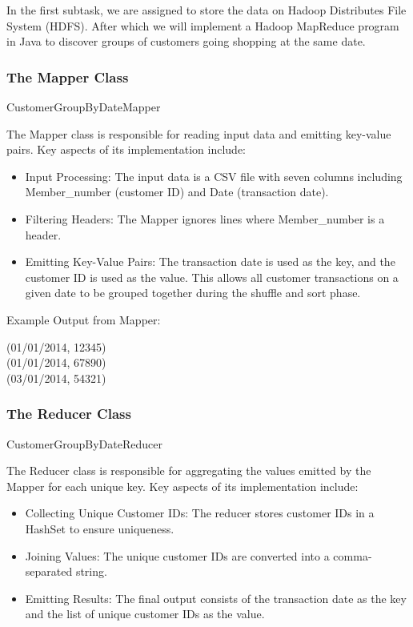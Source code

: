 In the first subtask, we are assigned to store the data on Hadoop Distributes File System (HDFS).
After which we will implement a Hadoop MapReduce program in Java to discover groups of customers going shopping at the same date.

\subsubsection{The Mapper Class} CustomerGroupByDateMapper

The Mapper class is responsible for reading input data and emitting key-value pairs.
Key aspects of its implementation include:

\begin{itemize}
    \item Input Processing: The input data is a CSV file with seven columns including Member\_number (customer ID) and Date (transaction date).
    \item Filtering Headers: The Mapper ignores lines where Member\_number is a header.
    \item Emitting Key-Value Pairs: The transaction date is used as the key, and the customer ID is used as the value.
    This allows all customer transactions on a given date to be grouped together during the shuffle and sort phase.
\end{itemize}

Example Output from Mapper:
\begin{center}
(01/01/2014, 12345)\\
(01/01/2014, 67890)\\
(03/01/2014, 54321)
\end{center}

\subsubsection{The Reducer Class} CustomerGroupByDateReducer

The Reducer class is responsible for aggregating the values emitted by the Mapper for each unique key.
Key aspects of its implementation include:

\begin{itemize}
    \item Collecting Unique Customer IDs: The reducer stores customer IDs in a HashSet to ensure uniqueness.
    \item Joining Values: The unique customer IDs are converted into a comma-separated string.
    \item Emitting Results: The final output consists of the transaction date as the key and the list of unique customer IDs as the value.
\end{itemize}

